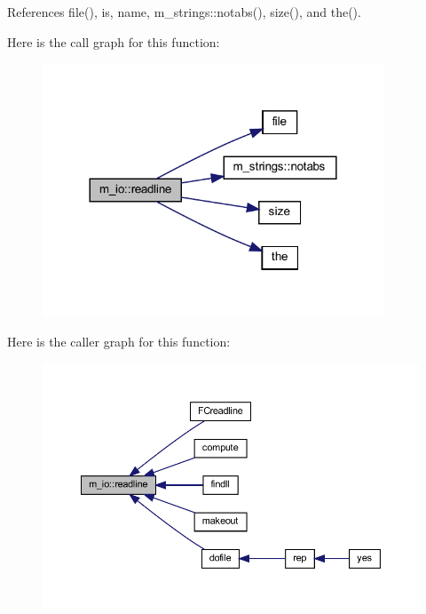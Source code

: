References file(), is, name, m\+\_\+strings\+::notabs(), size(), and the().

Here is the call graph for this function\+:
\nopagebreak
\begin{figure}[H]
\begin{center}
\leavevmode
\includegraphics[width=288pt]{namespacem__io_a8d9ee59e21830662fa59c300ca23e04b_cgraph}
\end{center}
\end{figure}
Here is the caller graph for this function\+:
\nopagebreak
\begin{figure}[H]
\begin{center}
\leavevmode
\includegraphics[width=350pt]{namespacem__io_a8d9ee59e21830662fa59c300ca23e04b_icgraph}
\end{center}
\end{figure}
\mbox{\label{namespacem__io_ad25822cde8058cd6861e2d9a5d729ccc}} 
